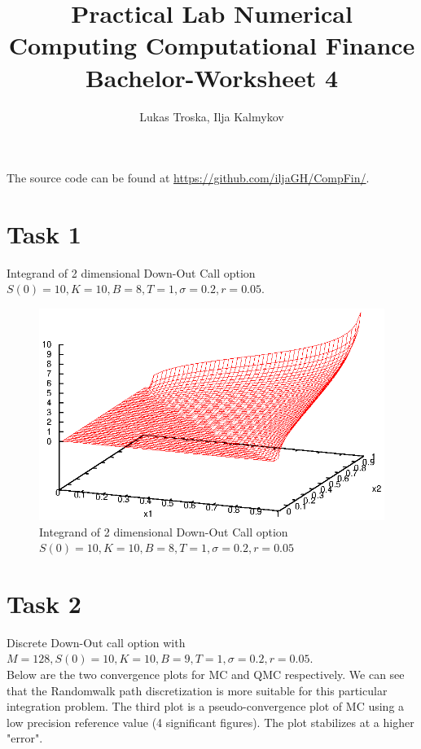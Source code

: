 \documentclass[]{article}
\title{Practical Lab Numerical Computing Computational Finance \\Bachelor-Worksheet 4}
\author{Lukas Troska, Ilja Kalmykov}
\date{}
\begin{document}
\maketitle

The source code can be found at \url{https://github.com/iljaGH/CompFin/}.

\section*{Task 1}
Integrand of 2 dimensional Down-Out Call option $S(0)=10,K=10,B=8,T=1,\sigma=0.2,r=0.05$.\\
\begin{figure}[!ht]
\centering
\includegraphics[width=.9\textwidth]{task1.eps}
\caption{Integrand of 2 dimensional Down-Out Call option $S(0)=10,K=10,B=8,T=1,\sigma=0.2,r=0.05$}
\label{fig:Task1}
\end{figure}
\clearpage


\section*{Task 2}
Discrete Down-Out call option with $M=128,S(0)=10,K=10,B=9,T=1,\sigma=0.2,r=0.05$.\\Below are the two convergence plots for MC and QMC respectively. We can see that the Randomwalk path discretization is more suitable for this particular integration problem. The third plot is a pseudo-convergence plot of MC using a low precision reference value (4 significant figures). The plot stabilizes at a higher "error".
\end{document}
